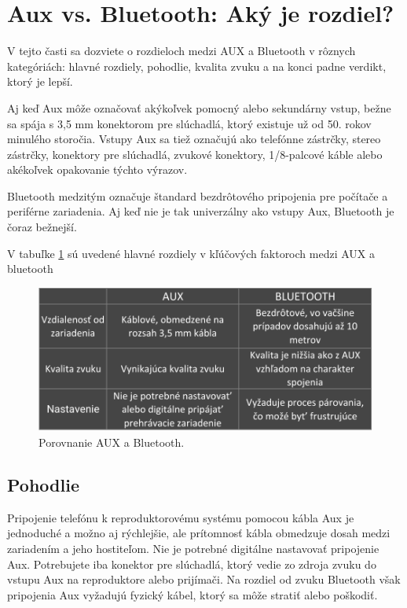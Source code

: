 \documentclass[10pt,twoside,slovak,a4paper]{article}
\begin{document}
\section{Aux vs. Bluetooth: Aký je rozdiel?} \label{rozdiel} 

V tejto časti sa dozviete o rozdieloch medzi AUX a Bluetooth v rôznych kategóriách: hlavné rozdiely, pohodlie, kvalita zvuku a na konci padne verdikt, ktorý je lepší.

Aj keď Aux môže označovať akýkoľvek pomocný alebo sekundárny vstup, bežne sa spája s 3,5 mm konektorom pre slúchadlá, ktorý existuje už od 50. rokov minulého storočia. Vstupy Aux sa tiež označujú ako telefónne zástrčky, stereo zástrčky, konektory pre slúchadlá, zvukové konektory, 1/8-palcové káble alebo akékoľvek opakovanie týchto výrazov.\cite{Laukkonen}

Bluetooth medzitým označuje štandard bezdrôtového pripojenia pre počítače a periférne zariadenia. Aj keď nie je tak univerzálny ako vstupy Aux, Bluetooth je čoraz bežnejší.\cite{Laukkonen}

 V tabuľke \ref{f:rozhod4} sú uvedené hlavné rozdiely v kľúčových faktoroch medzi AUX a bluetooth 
\begin{figure}[tbh]
\centering
\includegraphics[scale=0.8]{AUXvsBluetooth.pdf}
\caption{Porovnanie AUX a Bluetooth.\cite{Laukkonen}}
\label{f:rozhod4}
\end{figure}

\subsection{Pohodlie} \label{pohodlie} 

Pripojenie telefónu k reproduktorovému systému pomocou kábla Aux je jednoduché a možno aj rýchlejšie, ale prítomnosť kábla obmedzuje dosah medzi zariadením a jeho hostiteľom. Nie je potrebné digitálne nastavovať pripojenie Aux. Potrebujete iba konektor pre slúchadlá, ktorý vedie zo zdroja zvuku do vstupu Aux na reproduktore alebo prijímači. Na rozdiel od zvuku Bluetooth však pripojenia Aux vyžadujú fyzický kábel, ktorý sa môže stratiť alebo poškodiť.\cite{Laukkonen}
\end{document}
